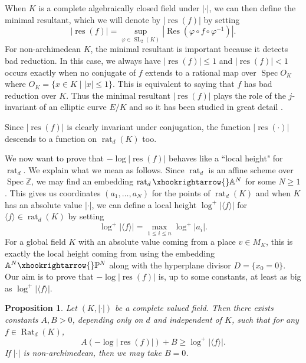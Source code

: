 \documentclass[10pt]{amsart}
\newcommand{\bb}{\mathbb}
\newcommand{\vphi}{\varphi}
\newcommand{\Res}{\operatorname{Res}}
\newcommand{\res}{\operatorname{res}}
\newcommand{\Spec}{\operatorname{Spec}}
\newcommand{\Rat}{\operatorname{Rat}}
\newcommand{\rat}{\operatorname{rat}}
\newcommand{\SL}{\operatorname{SL}}
\numberwithin{theorem}{section}
\newtheorem{proposition}[theorem]{Proposition}
\numberwithin{example}{section}
\numberwithin{definition}{section}
\begin{document}
\par 
When $K$ is a complete algebraically closed field under $| \cdot |$, we can then define the minimal resultant, which we will denote by $|\res(f)|$ by setting
$$|\res(f)| = \sup_{\vphi \in \SL_2(K)} |\Res(\vphi \circ f \circ \vphi^{-1})|.$$
For non-archimedean $K$, the minimal resultant is important because it detects bad reduction. In this case, we always have $|\res(f)| \leq 1$ and $|\res(f)| < 1$ occurs exactly when no conjugate of $f$ extends to a rational map over $\Spec O_K$ where $O_K = \{x \in K \mid |x| \leq 1\}$. This is equivalent to saying that $f$ has bad reduction over $K$. Thus the minimal resultant $|\res(f)|$ plays the role of the $j$-invariant of an elliptic curve $E/K$ and so it has been studied in great detail \cite{STW14, Rum15}. 
\par 
Since $|\res(f)|$ is clearly invariant under conjugation, the function $|\res( \cdot )|$ descends to a function on $\rat_d(K)$ too.
\par 
We now want to prove that $-\log |\res(f)|$ behaves like a ``local height" for $\rat_d$. We explain what we mean as follows. Since $\rat_d$ is an affine scheme over $\Spec \bb{Z}$, we may find an embedding $\rat_d \xhookrightarrow{} \bb{A}^N$ for some $N \geq 1$. This gives us coordinates $(a_1,\ldots,a_N)$ for the points of $\rat_d(K)$ and when $K$ has an absolute value $| \cdot |$, we can define a local height $\log^+|\langle f \rangle|$ for $\langle f \rangle \in \rat_d(K)$ by setting
$$\log^+ |\langle f \rangle| = \max_{1 \leq i \leq n} \log^+|a_i|.$$
For a global field $K$ with an absolute value coming from a place $v \in M_K$, this is exactly the local height coming from using the embedding $\bb{A}^N \xhookrightarrow{} \bb{P}^N$ along with the hyperplane divisor $D = \{x_0 = 0\}$. Our aim is to prove that $-\log |\res(f)|$ is, up to some constants, at least as big as $\log^+|\langle f \rangle|$. 

\begin{proposition} \label{LocalResComparison1}
Let $(K, |\cdot |)$ be a complete valued field. Then there exists constants $A,B > 0$, depending only on $d$ and independent of $K$, such that for any $f \in \Rat_d(K)$,
$$A( -\log|\res(f)|) + B \geq \log^+|\langle f \rangle|.$$
If $| \cdot |$ is non-archimedean, then we may take $B = 0$. 
\end{proposition}
\end{document}
